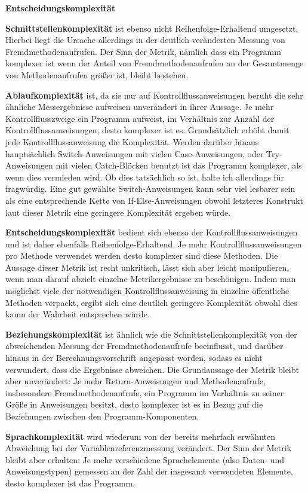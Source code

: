 \documentclass[gb,ngerman]{stthesis}
\begin{document}
\begin{labeling}{\textbf{Entscheidungskomplexität}}
				\item[\textbf{Schnittstellenkomplexität}] ist ebenso nicht Reihenfolge-Erhaltend umgesetzt. Hierbei liegt die Ursache allerdings in der deutlich veränderten Messung von Fremdmethodenaufrufen. Der Sinn der Metrik, nämlich dass ein Programm komplexer ist wenn der Anteil von Fremdmethodenaufrufen an der Gesamtmenge von Methodenaufrufen größer ist, bleibt bestehen.
				\item[\textbf{Ablaufkomplexität}] ist, da sie nur auf Kontrollflussanweisungen beruht die sehr ähnliche Messergebnisse aufweisen unverändert in ihrer Aussage. Je mehr Kontrollflusszweige ein Programm aufweist, im Verhältnis zur Anzahl der Kontrollflussanweisungen, desto komplexer ist es. Grundsätzlich erhöht damit jede Kontrollflussanweisung die Komplexität. Werden darüber hinaus hauptsächlich Switch-Anweisungen mit vielen Case-Anweisungen, oder Try-Anweisungen mit vielen Catch-Blöcken benutzt ist das Programm komplexer, als wenn dies vermieden wird. Ob dies tatsächlich so ist, halte ich allerdings für fragwürdig. Eine gut gewählte Switch-Anweisungen kann sehr viel lesbarer sein als eine entsprechende Kette von If-Else-Anweisungen obwohl letzteres Konstrukt laut dieser Metrik eine geringere Komplexität ergeben würde.
				\item[\textbf{Entscheidungskomplexität}] bedient sich ebenso der Kontrollflussanweisungen und ist daher ebenfalls Reihenfolge-Erhaltend. Je mehr Kontrollflussanweisungen pro Methode verwendet werden desto komplexer sind diese Methoden. Die Aussage dieser Metrik ist recht unkritisch, lässt sich aber leicht manipulieren, wenn man darauf abzielt einzelne Metrikergebnisse zu beschönigen. Indem man möglichst viele der notwendigen Kontrollflussanweisung in einzelne öffentliche Methoden verpackt, ergibt sich eine deutlich geringere Komplexität obwohl dies kaum der Wahrheit entsprechen würde.
				\item[\textbf{Beziehungskomplexität}] ist ähnlich wie die Schnittstellenkomplexität von der abweichenden Messung der Fremdmethodenaufrufe beeinflusst, und darüber hinaus in der Berechnungsvorschrift angepasst worden, sodass es nicht verwundert, dass die Ergebnisse abweichen. Die Grundaussage der Metrik bleibt aber unverändert: Je mehr Return-Anweisungen und Methodenaufrufe, insbesondere Fremdmethodenaufrufe, ein Programm im Verhältnis zu seiner Größe in Anweisungen besitzt, desto komplexer ist es in Bezug auf die Beziehungen zwischen den Programm-Komponenten. 
				\item[\textbf{Sprachkomplexität}] wird wiederum von der bereits mehrfach erwähnten Abweichung bei der Variablenreferenzmessung verändert. Der Sinn der Metrik bleibt aber erhalten: Je mehr verschiedene Sprachelemente (also Daten- und Anweisungstypen) gemessen an der Zahl der insgesamt verwendeten Elemente, desto komplexer ist das Programm.

\end{labeling}
\end{document}
